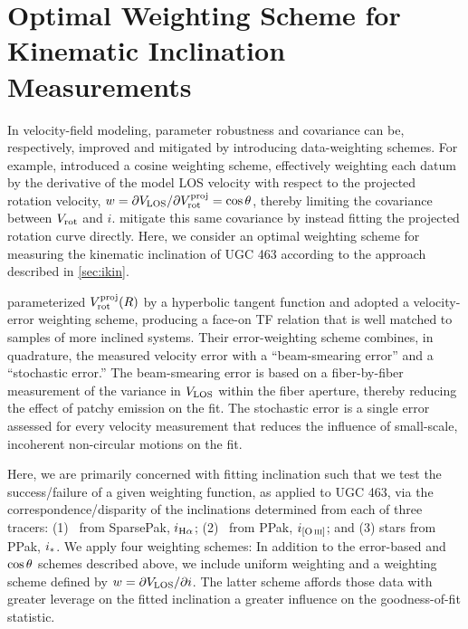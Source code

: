 \documentclass[apj,iop,numberedappendix]{emulateapj}
\begin{document}
\section{Optimal Weighting Scheme for Kinematic Inclination Measurements}
\label{app:ikin}

In velocity-field modeling, parameter robustness and covariance can be,
respectively, improved and mitigated by introducing data-weighting schemes.  For
example, \citet{1989A&A...223...47B} introduced a cosine weighting scheme,
effectively weighting each datum by the derivative of the model LOS velocity
with respect to the projected rotation velocity, $w =
\partial V_{\rm LOS}/\partial V_{\rm rot}^{\rm proj} = \cos\theta$, thereby limiting the covariance
between $V_{\rm rot}$ and $i$.  \citet{2003ApJ...599L..79A} mitigate this same
covariance by instead fitting the projected rotation curve directly.  Here, we
consider an optimal weighting scheme for measuring the kinematic inclination of
UGC 463 according to the approach described in \sect \ref{sec:ikin}.

\citet{2003ApJ...599L..79A} parameterized $V_{\rm rot}^{\rm proj}(R)$ by a hyperbolic tangent
function and adopted a velocity-error weighting scheme, producing a face-on TF
relation that is well matched to samples of more inclined systems.  Their
error-weighting scheme combines, in quadrature, the measured velocity error with
a ``beam-smearing error'' and a ``stochastic error.''  The beam-smearing error
is based on a fiber-by-fiber measurement of the variance in $V_{\rm LOS}$ within the
fiber aperture, thereby reducing the effect of patchy emission on the fit.  The
stochastic error is a single error assessed for every velocity measurement that
reduces the influence of small-scale, incoherent non-circular motions on the
fit.

Here, we are primarily concerned with fitting inclination such that we test the
success/failure of a given weighting function, as applied to UGC 463, via the
correspondence/disparity of the inclinations determined from each of three
tracers: (1) \halp\ from SparsePak, $i_{\mbox{\scriptsize H$\alpha$}}$; (2) \oiii\ from PPak, $i_{\mbox{\scriptsize [O{\scshape$~\!$iii}]}}$; and
(3) stars from PPak, $i_{\ast}$.  We apply four weighting schemes:  In addition to
the error-based and $\cos\theta$ schemes described above, we include uniform
weighting and a weighting scheme defined by $w = \partial V_{\rm LOS}/\partial i$.  The
latter scheme affords those data with greater leverage on the fitted inclination
a greater influence on the goodness-of-fit statistic.
\end{document}
